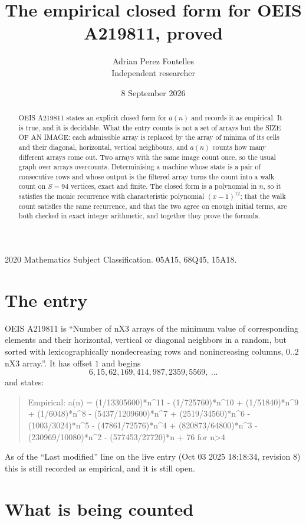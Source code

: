 \documentclass[11pt,a4paper]{article}
\title{The empirical closed form for OEIS A219811, proved}
\author{Adrian Perez Fontelles\\ \small Independent researcher}
\date{8 September 2026}
\theoremstyle{plain}
\theoremstyle{definition}
\begin{document}
\maketitle

\begin{abstract}
OEIS A219811 states an explicit closed form for $a(n)$ and records it as empirical. It is true, and
it is decidable. What the entry counts is not a set of arrays but the SIZE OF AN IMAGE: each
admissible array is replaced by the array of minima of its cells and their diagonal, horizontal, vertical neighbours,
and $a(n)$ counts how many different arrays come out. Two arrays with the same image count
once, so the usual graph over arrays overcounts. Determinising a machine whose state is a pair
of consecutive rows and whose output is the filtered array turns the count into a walk count on
$S=94$ vertices, exact and finite. The closed form is a polynomial in $n$, so it satisfies the
monic recurrence with characteristic polynomial $(x-1)^{12}$; that the walk count
satisfies the same recurrence, and that the two agree on enough initial terms, are both checked
in exact integer arithmetic, and together they prove the formula.
\end{abstract}

\noindent\small 2020 Mathematics Subject Classification. 05A15, 68Q45, 15A18.\normalsize

\section{The entry}

OEIS A219811 is ``Number of nX3 arrays of the minimum value of corresponding elements and their horizontal, vertical or diagonal neighbors in a random, but sorted with lexicographically nondecreasing rows and nonincreasing columns, 0..2 nX3 array.''. It has offset $1$ and begins
\[
6, 15, 62, 169, 414, 987, 2359, 5569,\ \dots
\]
and states:
\begin{quote}
Empirical: a(n) = (1/13305600)*n\^{}11 - (1/725760)*n\^{}10 + (1/51840)*n\^{}9 + (1/6048)*n\^{}8 - (5437/1209600)*n\^{}7 + (2519/34560)*n\^{}6 - (1003/3024)*n\^{}5 - (47861/72576)*n\^{}4 + (820873/64800)*n\^{}3 - (230969/10080)*n\^{}2 - (577453/27720)*n + 76 for n>4
\end{quote}
As of the ``Last modified'' line on the live entry (Oct 03 2025 18:18:34, revision 8)
this is still recorded as empirical, and it is still open.

\section{What is being counted}
\end{document}
